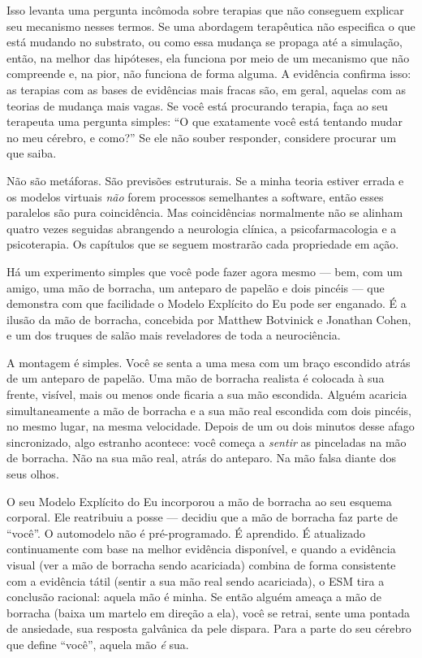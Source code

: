 \documentclass[11pt, twoside, openright]{book}
\begin{document}
Isso levanta uma pergunta incômoda sobre terapias que não conseguem explicar seu mecanismo nesses termos. Se uma abordagem terapêutica não especifica o que está mudando no substrato, ou como essa mudança se propaga até a simulação, então, na melhor das hipóteses, ela funciona por meio de um mecanismo que não compreende e, na pior, não funciona de forma alguma. A evidência confirma isso: as terapias com as bases de evidências mais fracas são, em geral, aquelas com as teorias de mudança mais vagas. Se você está procurando terapia, faça ao seu terapeuta uma pergunta simples: ``O que exatamente você está tentando mudar no meu cérebro, e como?'' Se ele não souber responder, considere procurar um que saiba.

Não são metáforas. São previsões estruturais. Se a minha teoria estiver errada e os modelos virtuais \textit{não} forem processos semelhantes a software, então esses paralelos são pura coincidência. Mas coincidências normalmente não se alinham quatro vezes seguidas abrangendo a neurologia clínica, a psicofarmacologia e a psicoterapia. Os capítulos que se seguem mostrarão cada propriedade em ação.

Há um experimento simples que você pode fazer agora mesmo --- bem, com um amigo, uma mão de borracha, um anteparo de papelão e dois pincéis --- que demonstra com que facilidade o Modelo Explícito do Eu pode ser enganado. É a ilusão da mão de borracha, concebida por Matthew Botvinick e Jonathan Cohen, e um dos truques de salão mais reveladores de toda a neurociência.

A montagem é simples. Você se senta a uma mesa com um braço escondido atrás de um anteparo de papelão. Uma mão de borracha realista é colocada à sua frente, visível, mais ou menos onde ficaria a sua mão escondida. Alguém acaricia simultaneamente a mão de borracha e a sua mão real escondida com dois pincéis, no mesmo lugar, na mesma velocidade. Depois de um ou dois minutos desse afago sincronizado, algo estranho acontece: você começa a \textit{sentir} as pinceladas na mão de borracha. Não na sua mão real, atrás do anteparo. Na mão falsa diante dos seus olhos.

O seu Modelo Explícito do Eu incorporou a mão de borracha ao seu esquema corporal. Ele reatribuiu a posse --- decidiu que a mão de borracha faz parte de ``você''. O automodelo não é pré-programado. É aprendido. É atualizado continuamente com base na melhor evidência disponível, e quando a evidência visual (ver a mão de borracha sendo acariciada) combina de forma consistente com a evidência tátil (sentir a sua mão real sendo acariciada), o ESM tira a conclusão racional: aquela mão é minha. Se então alguém ameaça a mão de borracha (baixa um martelo em direção a ela), você se retrai, sente uma pontada de ansiedade, sua resposta galvânica da pele dispara. Para a parte do seu cérebro que define ``você'', aquela mão \textit{é} sua.
\end{document}
